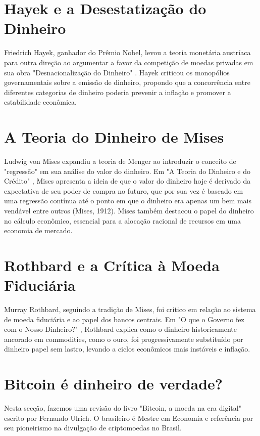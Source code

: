 \section*{Hayek e a Desestatização do Dinheiro}
Friedrich Hayek, ganhador do Prêmio Nobel, levou a teoria monetária austríaca para outra direção ao argumentar a favor da competição de moedas privadas em sua obra "Desnacionalização do Dinheiro" \cite{hayek2017desestatizaccao}. Hayek criticou os monopólios governamentais sobre a emissão de dinheiro, propondo que a concorrência entre diferentes categorias de dinheiro poderia prevenir a inflação e promover a estabilidade econômica.

\section*{A Teoria do Dinheiro de Mises}
Ludwig von Mises expandiu a teoria de Menger ao introduzir o conceito de "regressão" em sua análise do valor do dinheiro. Em "A Teoria do Dinheiro e do Crédito" \cite{von2013theory}, Mises apresenta a ideia de que o valor do dinheiro hoje é derivado da expectativa de seu poder de compra no futuro, que por sua vez é baseado em uma regressão contínua até o ponto em que o dinheiro era apenas um bem mais vendável entre outros (Mises, 1912). Mises também destacou o papel do dinheiro no cálculo econômico, essencial para a alocação racional de recursos em uma economia de mercado.

\section*{Rothbard e a Crítica à Moeda Fiduciária}
Murray Rothbard, seguindo a tradição de Mises, foi crítico em relação ao sistema de moeda fiduciária e ao papel dos bancos centrais. Em "O que o Governo fez com o Nosso Dinheiro?" \cite{rothbard2022governo}, Rothbard explica como o dinheiro historicamente ancorado em commodities, como o ouro, foi progressivamente substituído por dinheiro papel sem lastro, levando a ciclos econômicos mais instáveis e inflação.

\section{Bitcoin é dinheiro de verdade?} \label{sec:dinheiro}
Nesta secção, fazemos uma revisão do livro "Bitcoin, a moeda na era digital"\cite{Ulrich2014} escrito por Fernando Ulrich. O brasileiro é Mestre em Economia e referência por seu pioneirismo na divulgação de criptomoedas no Brasil. 

